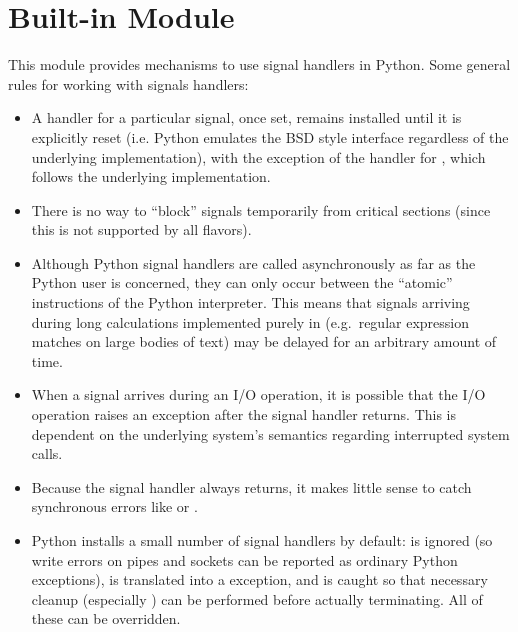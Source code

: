 \section{Built-in Module }
\label{module-signal}

This module provides mechanisms to use signal handlers in Python.
Some general rules for working with signals handlers:

\begin{itemize}

\item
A handler for a particular signal, once set, remains installed until
it is explicitly reset (i.e. Python emulates the BSD style interface
regardless of the underlying implementation), with the exception of
the handler for , which follows the underlying
implementation.

\item
There is no way to ``block'' signals temporarily from critical
sections (since this is not supported by all \UNIX{} flavors).

\item
Although Python signal handlers are called asynchronously as far as
the Python user is concerned, they can only occur between the
``atomic'' instructions of the Python interpreter.  This means that
signals arriving during long calculations implemented purely in \C{}
(e.g.\ regular expression matches on large bodies of text) may be
delayed for an arbitrary amount of time.

\item
When a signal arrives during an I/O operation, it is possible that the
I/O operation raises an exception after the signal handler returns.
This is dependent on the underlying \UNIX{} system's semantics regarding
interrupted system calls.

\item
Because the \C{} signal handler always returns, it makes little sense to
catch synchronous errors like  or .

\item
Python installs a small number of signal handlers by default:
 is ignored (so write errors on pipes and sockets can be
reported as ordinary Python exceptions),  is translated
into a  exception, and  is
caught so that necessary cleanup (especially ) can
be performed before actually terminating.  All of these can be
overridden.


\end{itemize}
